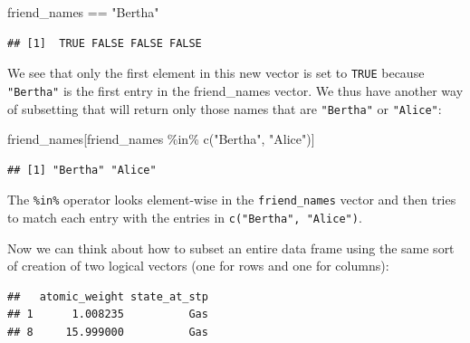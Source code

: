 \documentclass[]{tufte-book}
\newenvironment{Shaded}{\begin{snugshade}}{\end{snugshade}}
\newcommand{\FunctionTok}[1]{\textcolor[rgb]{0.00,0.00,0.00}{#1}}
\newcommand{\NormalTok}[1]{#1}
\newcommand{\SpecialCharTok}[1]{\textcolor[rgb]{0.00,0.00,0.00}{#1}}
\newcommand{\StringTok}[1]{\textcolor[rgb]{0.31,0.60,0.02}{#1}}
\begin{document}
\begin{Shaded}
\begin{Highlighting}[]
\NormalTok{friend\_names }\SpecialCharTok{==} \StringTok{"Bertha"}
\end{Highlighting}
\end{Shaded}

\begin{verbatim}
## [1]  TRUE FALSE FALSE FALSE
\end{verbatim}

We see that only the first element in this new vector is set to \texttt{TRUE} because \texttt{"Bertha"} is the first entry in the friend\_names vector. We thus have another way of subsetting that will return only those names that are \texttt{"Bertha"} or \texttt{"Alice"}:

\begin{Shaded}
\begin{Highlighting}[]
\NormalTok{friend\_names[friend\_names }\SpecialCharTok{\%in\%} \FunctionTok{c}\NormalTok{(}\StringTok{"Bertha"}\NormalTok{, }\StringTok{"Alice"}\NormalTok{)]}
\end{Highlighting}
\end{Shaded}

\begin{verbatim}
## [1] "Bertha" "Alice"
\end{verbatim}

The \texttt{\%in\%} operator looks element-wise in the \texttt{friend\_names} vector and then tries to match each entry with the entries in \texttt{c("Bertha",\ "Alice")}.

Now we can think about how to subset an entire data frame using the same sort of creation of two logical vectors (one for rows and one for columns):

\begin{Shaded}
\end{Shaded}

\begin{verbatim}
##   atomic_weight state_at_stp
## 1      1.008235          Gas
## 8     15.999000          Gas
\end{verbatim}
\end{document}
